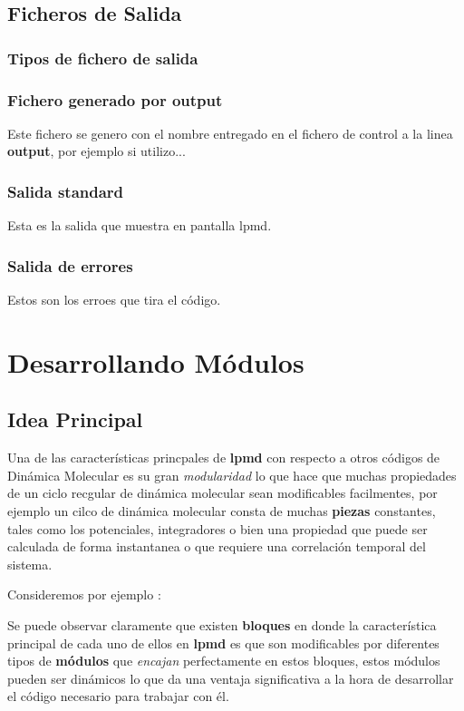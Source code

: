 \documentclass[a4paper,10pt]{scrbook}
\newcommand{\lpmd}{\textbf{lpmd }}
\begin{document}
\section{Ficheros de Salida}

\subsection{Tipos de fichero de salida}
\subsection{Fichero generado por output}
Este fichero se genero con el nombre entregado en el fichero de control a la linea \textbf{output}, por ejemplo si utilizo...
\subsection{Salida standard}
Esta es la salida que muestra en pantalla lpmd.
\subsection{Salida de errores}
Estos son los erroes que tira el c\'odigo.

\chapter{Desarrollando M\'odulos}
\label{chap:own}

\section{Idea Principal}

Una de las caracter\'isticas princpales de \lpmd con respecto a otros c\'odigos de Din\'amica Molecular es su gran \textit{modularidad} lo que hace que muchas propiedades de un ciclo recgular de din\'amica molecular sean modificables facilmentes, por ejemplo un cilco de din\'amica molecular consta de muchas \textbf{piezas} constantes, tales como los potenciales, integradores o bien una propiedad que puede ser calculada de forma instantanea o que requiere una correlaci\'on temporal del sistema.

Consideremos por ejemplo :

Se puede observar claramente que existen \textbf{bloques} en donde la caracter\'istica principal de cada uno de ellos en \lpmd es que son modificables por diferentes tipos de \textbf{m\'odulos} que \textit{encajan} perfectamente en estos bloques, estos m\'odulos pueden ser din\'amicos lo que da una ventaja significativa a la hora de desarrollar el c\'odigo necesario para trabajar con \'el.
\end{document}

